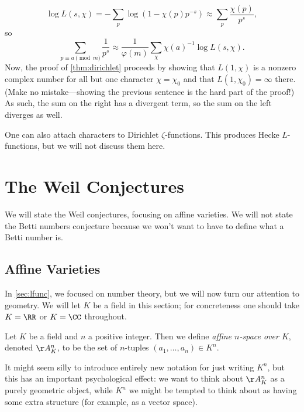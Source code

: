 \documentclass{article}
\begin{document}
\[\log L(s,\chi)=-\sum_p\log\left(1-\chi(p)p^{-s}\right)\approx\sum_p\frac{\chi(p)}{p^s},\]
so
\[\sum_{p\equiv a\pmod m}\frac1{p^s}\approx\frac1{\varphi(m)}\sum_\chi\chi(a)^{-1}\log L(s,\chi).\]
Now, the proof of \autoref{thm:dirichlet} proceeds by showing that $L(1,\chi)$ is a nonzero complex number for all but one character $\chi=\chi_0$ and that $L(1,\chi_0)=\infty$ there. (Make no mistake---showing the previous sentence is the hard part of the proof!) As such, the sum on the right has a divergent term, so the sum on the left diverges as well.
\begin{remark}
	One can also attach characters to Dirichlet $\zeta$-functions. This produces Hecke $L$-functions, but we will not discuss them here.
\end{remark}

\section{The Weil Conjectures}
We will state the Weil conjectures, focusing on affine varieties. We will not state the Betti numbers conjecture because we won't want to have to define what a Betti number is.

\subsection{Affine Varieties}
In \autoref{sec:lfunc}, we focused on number theory, but we will now turn our attention to geometry. We will let $K$ be a field in this section; for concreteness one should take $K=\RR$ or $K=\CC$ throughout.
\begin{definition}
	Let $K$ be a field and $n$ a positive integer. Then we define \textit{affine $n$-space over $K$}, denoted $\AA_K^n$, to be the set of $n$-tuples $(a_1,\ldots,a_n)\in K^n$.
\end{definition}
It might seem silly to introduce entirely new notation for just writing $K^n$, but this has an important psychological effect: we want to think about $\AA_K^n$ as a purely geometric object, while $K^n$ we might be tempted to think about as having some extra structure (for example, as a vector space).
\end{document}

